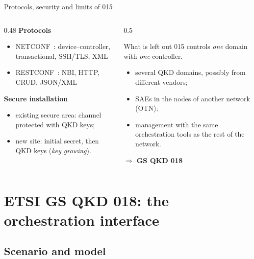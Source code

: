 \documentclass[10pt]{beamer}
\begin{document}
\begin{frame}{Protocols, security and limits of 015}
  \begin{columns}[T]
    \begin{column}{0.48\textwidth}
      \textbf{Protocols}
      \begin{itemize}\small
        \item NETCONF~\cite{rfc6241}: device–controller, transactional,
              SSH/TLS, XML
        \item RESTCONF~\cite{rfc8040}: NBI, HTTP, CRUD, JSON/XML
      \end{itemize}
      \textbf{Secure installation}
      \begin{itemize}\small
        \item existing secure area: channel protected with QKD keys;
        \item new site: initial secret, then QKD keys
              (\emph{key growing}).
      \end{itemize}
    \end{column}
    \begin{column}{0.5\textwidth}
      \begin{alertblock}{What is left out}
        015 controls \emph{one} domain with \emph{one} controller.
        \begin{itemize}\small
          \item several QKD domains, possibly from different vendors;
          \item SAEs in the nodes of another network (OTN);
          \item management with the same orchestration tools as the rest
                of the network.
        \end{itemize}
      \end{alertblock}
      \centering$\Rightarrow$ \textbf{GS QKD 018}
    \end{column}
  \end{columns}
\end{frame}

\section[GS QKD 018]{ETSI GS QKD 018: the orchestration interface}

\subsection{Scenario and model}
\end{document}
